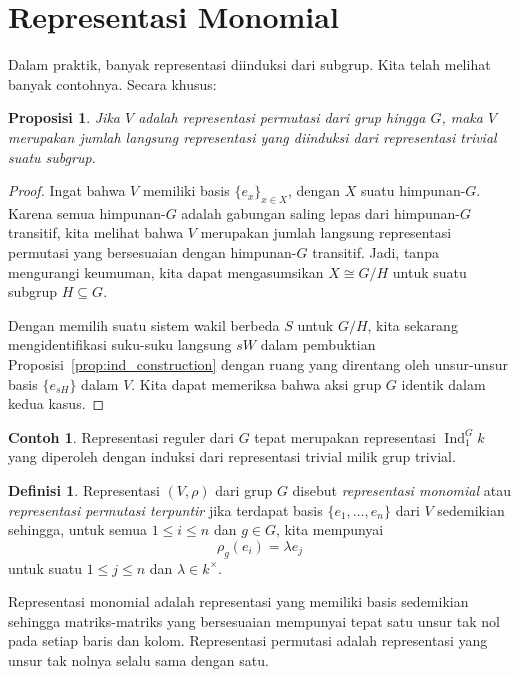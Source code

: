 \documentclass[12pt]{article}
\theoremstyle{plain}
\newtheorem{proposition}[theorem]{Proposisi}
\theoremstyle{definition}
\newtheorem{definition}[theorem]{Definisi}
\newtheorem{example}[theorem]{Contoh}
\theoremstyle{remark}
\numberwithin{equation}{section}
\begin{document}
\section{Representasi Monomial}

Dalam praktik, banyak representasi diinduksi dari subgrup. Kita telah
melihat banyak contohnya. Secara khusus:

\begin{proposition}
Jika $V$ adalah representasi permutasi dari grup hingga $G$,
maka $V$ merupakan jumlah langsung representasi yang diinduksi dari representasi
trivial suatu subgrup.
\end{proposition}

\begin{proof}
Ingat bahwa $V$ memiliki basis $\{e_x\}_{x \in X}$, dengan $X$ suatu himpunan-$G$.
Karena semua himpunan-$G$ adalah gabungan saling lepas dari himpunan-$G$ transitif,
kita melihat bahwa $V$ merupakan jumlah langsung representasi permutasi
yang bersesuaian dengan himpunan-$G$ transitif. Jadi, tanpa mengurangi keumuman,
kita dapat mengasumsikan $X \cong G/H$ untuk suatu subgrup $H \subseteq G$.

Dengan memilih suatu sistem wakil berbeda $S$ untuk $G/H$,
kita sekarang mengidentifikasi suku-suku langsung $sW$ dalam pembuktian
Proposisi~\ref{prop:ind_construction} dengan ruang yang direntang oleh
unsur-unsur basis $\{ e_{sH} \}$ dalam $V$.
Kita dapat memeriksa bahwa aksi grup $G$ identik dalam kedua kasus.
\end{proof}

\begin{example}
Representasi reguler dari $G$ tepat merupakan
representasi $\operatorname{Ind}^G_1 k$
yang diperoleh dengan induksi dari representasi trivial milik grup
trivial.
\end{example}

\begin{definition}
Representasi $(V,\rho)$ dari grup $G$ disebut \emph{representasi
monomial} atau \emph{representasi permutasi terpuntir} jika
terdapat basis $\{e_1,\ldots,e_n\}$ dari $V$
sedemikian sehingga, untuk semua $1 \le i \le n$ dan $g \in G$,
kita mempunyai
\[ \rho_g(e_i)=\lambda e_j\]
untuk suatu $1 \le j \le n$ dan $\lambda \in k^\times$.
\end{definition}

Representasi monomial adalah representasi yang memiliki basis sedemikian sehingga
matriks-matriks yang bersesuaian mempunyai
tepat satu unsur tak nol pada setiap baris dan kolom.
Representasi permutasi adalah representasi yang unsur tak nolnya
selalu sama dengan satu.
\end{document}
